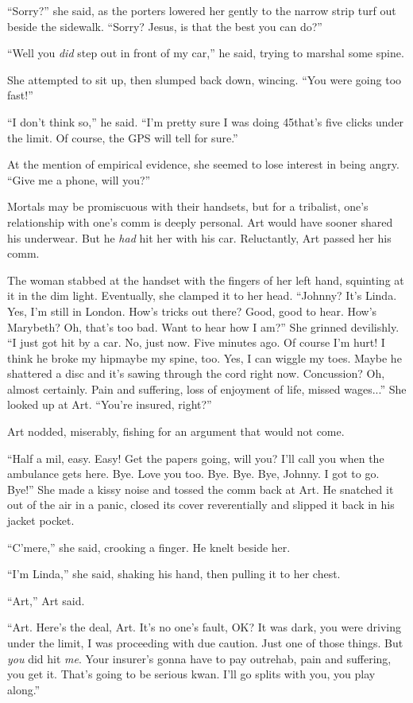 “Sorry?” she said, as the porters lowered her gently to the narrow
strip turf out beside the sidewalk. “Sorry? Jesus, is that the best
you can do?”

“Well you \emph{did} step out in front of my car,” he said, trying
to marshal some spine.

She attempted to sit up, then slumped back down, wincing. “You were
going too fast!”

“I don’t think so,” he said. “I’m pretty sure I was doing 45{\dash}that’s
five clicks under the limit. Of course, the GPS will tell for
sure.”

At the mention of empirical evidence, she seemed to lose interest
in being angry. “Give me a phone, will you?”

Mortals may be promiscuous with their handsets, but for a
tribalist, one’s relationship with one’s comm is deeply personal.
Art would have sooner shared his underwear. But he \emph{had} hit
her with his car. Reluctantly, Art passed her his comm.

The woman stabbed at the handset with the fingers of her left hand,
squinting at it in the dim light. Eventually, she clamped it to her
head. “Johnny? It’s Linda. Yes, I’m still in London. How’s tricks
out there? Good, good to hear. How’s Marybeth? Oh, that’s too bad.
Want to hear how I am?” She grinned devilishly. “I just got hit by
a car. No, just now. Five minutes ago. Of course I’m hurt! I think
he broke my hip{\dash}maybe my spine, too. Yes, I can wiggle my toes.
Maybe he shattered a disc and it’s sawing through the cord right
now. Concussion? Oh, almost certainly. Pain and suffering, loss of
enjoyment of life, missed wages...” She looked up at Art. “You’re
insured, right?”

Art nodded, miserably, fishing for an argument that would not
come.

“Half a mil, easy. Easy! Get the papers going, will you? I’ll call
you when the ambulance gets here. Bye. Love you too. Bye. Bye. Bye,
Johnny. I got to go. Bye!” She made a kissy noise and tossed the
comm back at Art. He snatched it out of the air in a panic, closed
its cover reverentially and slipped it back in his jacket pocket.

“C’mere,” she said, crooking a finger. He knelt beside her.

“I’m Linda,” she said, shaking his hand, then pulling it to her
chest.

“Art,” Art said.

“Art. Here’s the deal, Art. It’s no one’s fault, OK? It was dark,
you were driving under the limit, I was proceeding with due
caution. Just one of those things. But \emph{you} did hit
\emph{me}. Your insurer’s gonna have to pay out{\dash}rehab, pain and
suffering, you get it. That’s going to be serious kwan. I’ll go
splits with you, you play along.”

